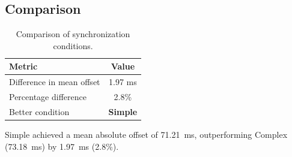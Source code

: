 \subsection*{Comparison}

\begin{table}[h!]
\centering
\begin{tabular}{|l|c|}
\hline
Metric & Value \\
\hline
Difference in mean offset & 1.97 ms \\
Percentage difference & 2.8\% \\
Better condition & \textbf{Simple} \\
\hline
\end{tabular}
\caption{Comparison of synchronization conditions.}
\label{tab:sync_comparison}
\end{table}

Simple achieved a mean absolute offset of 71.21~ms, outperforming Complex (73.18~ms) by 1.97~ms (2.8\%).
